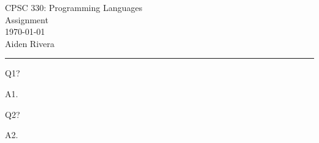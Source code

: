 \documentclass[12pt, letterpaper, onecolumn]{exam}
\begin{document}
\nopointsinmargin
\pointformat{}

\begingroup
\centering
\LARGE CPSC 330: Programming Languages\\
\LARGE Assignment\\[0.5em]
\large \today\\[0.5em]
\large Aiden Rivera\par
\endgroup

\rule{\textwidth}{0.4pt}

\printanswers
\renewcommand{\solutiontitle}{\noindent\textbf{Ans:}\enspace}

\begin{questions}
\question[0] Q1?

\begin{solution}
A1.
\end{solution}

\question[0] Q2?

\begin{solution}
A2.
\end{solution}

\end{questions}
\end{document}

